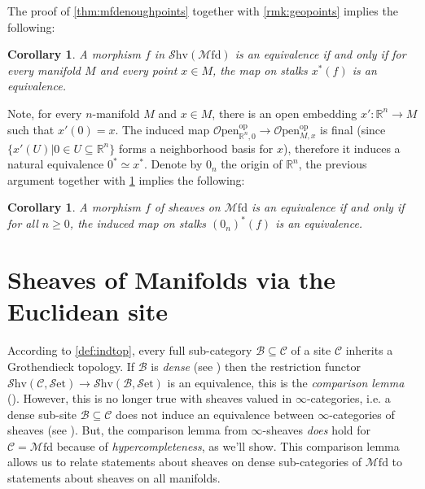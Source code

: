 \documentclass[10pt]{amsart}
\newcommand{\B}{\mathscr{B}}
\newcommand{\C}{\mathscr{C}}
\newcommand{\bR}{\mathbb{R}}
\newcommand{\set}{\mathscr{S}\mathrm{et}}
\newcommand{\Mfd}{\mathscr{M}\mathrm{fd}}
\newcommand{\Shv}{\mathscr{S}\mathrm{hv}}
\newcommand{\Open}{\mathscr{O}\mathrm{pen}}
\newcommand{\op}{\mathrm{op}}
\newtheorem{corollary}[equation]{Corollary}
\theoremstyle{definition}
\theoremstyle{remark}
\numberwithin{equation}{section}
\begin{document}
The proof of \cref{thm:mfdenoughpoints} together with \cref{rmk:geopoints} implies the following: 
\begin{corollary}\label{cor:points}
  A morphism $f$ in $\Shv(\Mfd)$ is an equivalence if and only if for every manifold $M$ and every point $x \in M$, the map on stalks $x^*(f)$ is an equivalence.
\end{corollary}
Note, for every $n$-manifold $M$ and $x\in M$, there is an open embedding $x':\bR^n\to M$ such that $x'(0)=x$. The induced map $\Open_{\bR^n,0}^{\op}\to\Open_{M,x}^{\op}$ is final (since $\{x'(U)|0\in U\subseteq\bR^n\}$ forms a neighborhood basis for $x$), therefore it induces a natural equivalence $0^*\simeq x^*$. Denote by $0_n$ the origin of $\bR^n$, the previous argument together with \cref{cor:points} implies the following:
\begin{corollary}
  A morphism $f$ of sheaves on $\Mfd$ is an equivalence if and only if for all $n \geq 0$, the induced map on stalks $(0_n)^*(f) $ is an equivalence.
\end{corollary}

\section{Sheaves of Manifolds via the Euclidean site}

According to \cref{def:indtop}, every full sub-category $\B\subseteq\C$ of a site $\C$ inherits a Grothendieck topology. If $\B$ is \emph{dense} (see \cite[Definition 2.2.1]{johnstone2002elephanti}) then the restriction functor $\Shv(\C,\set)\to\Shv(\B,\set)$ is an equivalence, this is the \emph{comparison lemma} (\cite[Theorem 2.2.3]{johnstone2002elephanti}). However, this is no longer true with sheaves valued in $\infty$-categories, i.e. a dense sub-site $\B\subseteq\C$ does not induce an equivalence between $\infty$-categories of sheaves (see \cite[Counterexample 20.4.0.1]{lurie2018sag}). But, the comparison lemma from $\infty$-sheaves \emph{does} hold for $\C=\Mfd$ because of \emph{hypercompleteness}, as we'll show. This comparison lemma allows us to relate statements about sheaves on dense sub-categories of $\Mfd$ to statements about sheaves on all manifolds.
\end{document}
